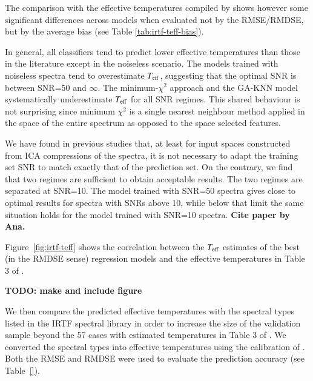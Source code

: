 The comparison with the effective temperatures compiled by
\cite{cesetti} shows however some significant differences across
models when evaluated not by the RMSE/RMDSE, but by the average bias
(see Table \ref{tab:irtf-teff-bias}). 

In general, all classifiers tend to predict lower effective
temperatures than those in the literature except in the noiseless
scenario. The models trained with noiseless spectra tend to
overestimate $T_{\rm eff}$, suggesting that the optimal SNR is between
SNR=50 and $\infty$. The minimum-$\chi^2$ approach and the GA-KNN
model systematically underestimate $T_{\rm eff}$ for all SNR
regimes. This shared behaviour is not surprising since minimum
$\chi^2$ is a single nearest neighbour method applied in the space of
the entire spectrum as opposed to the space selected features.

We have found in previous studies that, at least for input spaces
constructed from ICA compressions of the spectra, it is not necessary
to adapt the training set SNR to match exactly that of the prediction
set. On the contrary, we find that two regimes are sufficient to
obtain acceptable results. The two regimes are separated at
SNR=10. The model trained with SNR=50 spectra gives close to optimal
results for spectra with SNRs above 10, while below that limit the
same situation holds for the model trained with SNR=10 spectra. {\bf
  Cite paper by Ana.}

Figure~\ref{fig:irtf-teff} shows the correlation between the $T_{\rm
eff}$ estimates of the best (in the RMDSE sense) regression models and
the effective temperatures in Table 3 of \cite{cesetti}. 

{\bf TODO: make and include figure}

 

We then compare the predicted effective temperatures with the spectral
types listed in the IRTF spectral library in order to increase the
size of the validation sample beyond the 57 cases with estimated
temperatures in Table 3 of \cite{cesetti}. We converted the spectral
types into effective temperatures using the calibration of
\cite{2009ApJ...702..154S}. Both the RMSE and RMDSE were used to
evaluate the prediction accuracy (see Table~\ref{}).

